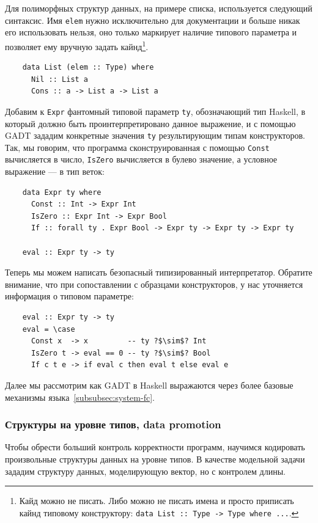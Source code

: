Для полиморфных структур данных, на примере списка, используется следующий синтаксис.
Имя \texttt{elem} нужно исключительно для документации и больше никак его использовать нельзя, оно только маркирует наличие типового параметра и позволяет ему вручную задать кайнд\footnote{Кайд можно не писать. Либо можно не писать имена и просто приписать кайнд типовому конструктору: \texttt{data List :: Type -> Type where ...}.}.
\begin{verbatim}
    data List (elem :: Type) where
      Nil :: List a
      Cons :: a -> List a -> List a
\end{verbatim}

Добавим к \texttt{Expr} фантомный типовой параметр \texttt{ty}, обозначающий тип Haskell, в который должно быть проинтерпретировано данное выражение, и с помощью GADT зададим конкретные значения \texttt{ty} результирующим типам конструкторов.
Так, мы говорим, что программа сконструированная с помощью \texttt{Const} вычисляется в число, \texttt{IsZero} вычисляется в булево значение, а условное выражение --- в тип веток:
\begin{verbatim}
    data Expr ty where
      Const :: Int -> Expr Int
      IsZero :: Expr Int -> Expr Bool
      If :: forall ty . Expr Bool -> Expr ty -> Expr ty -> Expr ty

    eval :: Expr ty -> ty
\end{verbatim}

Теперь мы можем написать безопасный типизированный интерпретатор.
Обратите внимание, что при сопоставлении с образцами конструкторов, у нас уточняется информация о типовом параметре:
\begin{verbatim}
    eval :: Expr ty -> ty
    eval = \case
      Const x  -> x         -- ty ?$\sim$? Int
      IsZero t -> eval == 0 -- ty ?$\sim$? Bool
      If c t e -> if eval c then eval t else eval e
\end{verbatim}

Далее мы рассмотрим как GADT в Haskell выражаются через более базовые механизмы языка~\ref{subsubsec:system-fc}.

\subsubsection{Структуры на уровне типов, data promotion} \label{subsubsec:promotion}

Чтобы обрести больший контроль корректности программ, научимся кодировать произвольные структуры данных на уровне типов.
В качестве модельной задачи зададим структуру данных, моделирующую вектор, но с контролем длины.

